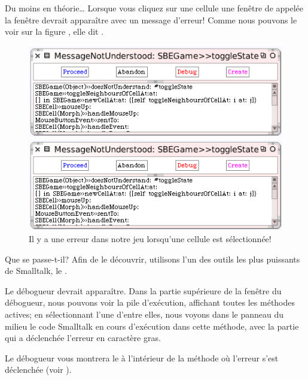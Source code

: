 \documentclass[a4paper,10pt,twoside]{book}
\begin{document}
Du moins en théorie\ldots{}
Lorsque vous cliquez sur une cellule une fenêtre de  appelée la fenêtre  devrait apparaître avec un message d'erreur!
Comme nous pouvons le voir sur la figure , elle dit .

\begin{figure}[ht]
\ifluluelse
	{\centerline{\includegraphics[width=\textwidth]{Error}}}
	{\centerline{\includegraphics[scale=0.7]{Error}}}
\caption{Il y a une erreur dans notre jeu lorsqu'une cellule est sélectionnée!
\label{fig:quintoError}}
\end{figure}

\noindent
Que se passe-t-il? Afin de le découvrir, utilisons l'un des outils les plus puissants de Smalltalk, le .

Le débogueur devrait apparaître.
Dans la partie sup\'erieure de la fenêtre du débogueur, nous pouvons
voir la pile d'exécution, affichant toutes les méthodes actives; en
sélectionnant l'une d'entre elles, nous voyons dans le panneau du
milieu le code Smalltalk en cours d'exécution dans cette méthode, avec
la partie qui a déclenchée l'erreur en caract\`ere gras.

Le débogueur vous montrera le  à l'intérieur
de la méthode où l'erreur s'est déclenchée (voir ).
\end{document}
